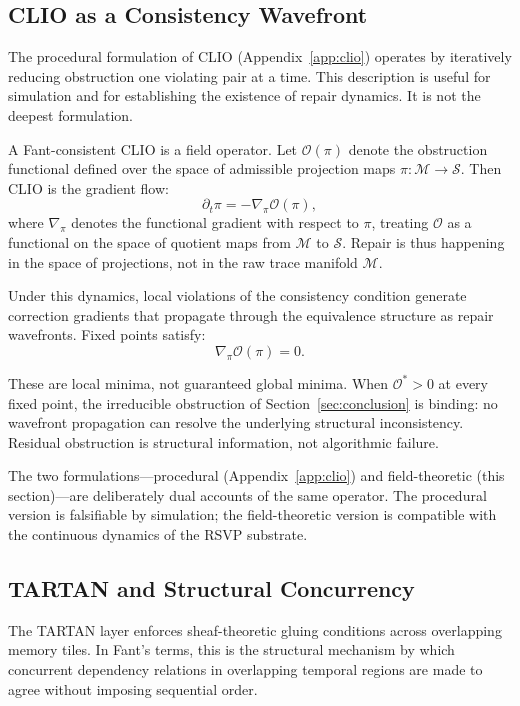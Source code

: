 \documentclass[12pt,a4paper]{article}
\begin{document}
\subsection{CLIO as a Consistency Wavefront}

The procedural formulation of CLIO (Appendix~\ref{app:clio}) operates by iteratively reducing obstruction one violating pair at a time. This description is useful for simulation and for establishing the existence of repair dynamics. It is not the deepest formulation.

A Fant-consistent CLIO is a field operator. Let $\mathcal{O}(\pi)$ denote the obstruction functional defined over the space of admissible projection maps $\pi : \mathcal{M} \to \mathcal{S}$. Then CLIO is the gradient flow:
\[
\partial_t \pi = - \nabla_{\pi} \mathcal{O}(\pi),
\]
where $\nabla_{\pi}$ denotes the functional gradient with respect to $\pi$, treating $\mathcal{O}$ as a functional on the space of quotient maps from $\mathcal{M}$ to $\mathcal{S}$. Repair is thus happening in the space of projections, not in the raw trace manifold $\mathcal{M}$.

Under this dynamics, local violations of the consistency condition generate correction gradients that propagate through the equivalence structure as repair wavefronts. Fixed points satisfy:
\[
\nabla_{\pi} \mathcal{O}(\pi) = 0.
\]

These are local minima, not guaranteed global minima. When $\mathcal{O}^* > 0$ at every fixed point, the irreducible obstruction of Section~\ref{sec:conclusion} is binding: no wavefront propagation can resolve the underlying structural inconsistency. Residual obstruction is structural information, not algorithmic failure.

The two formulations---procedural (Appendix~\ref{app:clio}) and field-theoretic (this section)---are deliberately dual accounts of the same operator. The procedural version is falsifiable by simulation; the field-theoretic version is compatible with the continuous dynamics of the RSVP substrate.

\subsection{TARTAN and Structural Concurrency}

The TARTAN layer enforces sheaf-theoretic gluing conditions across overlapping memory tiles. In Fant's terms, this is the structural mechanism by which concurrent dependency relations in overlapping temporal regions are made to agree without imposing sequential order.
\end{document}

